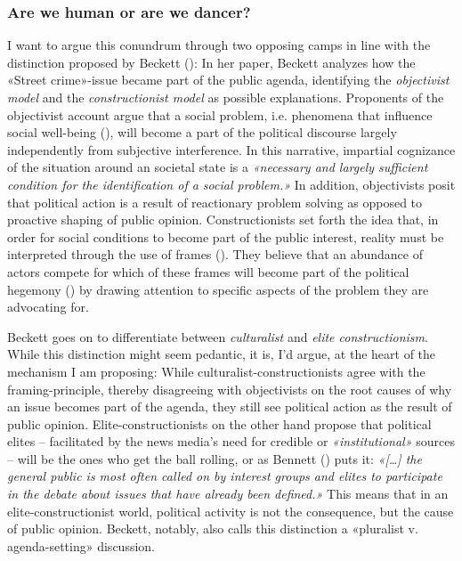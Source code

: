 \documentclass[11pt,a4paper]{article}
\begin{document}
\subsubsection{Are we human or are we dancer?}
I want to argue this conundrum through two opposing camps in line with the distinction proposed by Beckett (\citeyear{beckett_setting_1994}): In her paper, Beckett analyzes how the «Street crime»-issue became part of the public agenda, identifying the \textit{objectivist model} and the \textit{constructionist model }as possible explanations. Proponents of the objectivist account argue that a social problem, i.e. phenomena that influence social well-being (\cite{manis_concept_1974}), will become a part of the political discourse largely independently from subjective interference. In this narrative, impartial cognizance of the situation around an societal state is a \textit{«necessary and largely sufficient condition for the identification of a social problem.»} In addition, objectivists posit that political action is a result of reactionary problem solving as opposed to proactive shaping of public opinion. Constructionists set forth the idea that, in order for social conditions to become part of the public interest, reality must be interpreted through the use of frames (\cite{hall_policing_1978}). They believe that an abundance of actors compete for which of these frames will become part of the political hegemony (\cite{edelman_constructing_1988,gamson_media_1992}) by drawing attention to specific aspects of the problem they are advocating for. 

Beckett goes on to differentiate between \textit{culturalist} and \textit{elite constructionism}. While this distinction might seem pedantic, it is, I’d argue, at the heart of the mechanism I am proposing: While culturalist-constructionists agree with the framing-principle, thereby disagreeing with objectivists on the root causes of why an issue becomes part of the agenda, they still see political action as the result of public opinion. Elite-constructionists on the other hand propose that political elites – facilitated by the news media’s need for credible or \textit{«institutional»} sources – will be the ones who get the ball rolling, or as Bennett (\cite{bennett_public_1980}) puts it: \textit{«[…] the general public is most often called on by interest groups and elites to participate in the debate about issues that have already been defined.»} This means that in an elite-constructionist world, political activity is not the consequence, but the cause of public opinion. Beckett, notably, also calls this distinction a «pluralist v. agenda-setting» discussion.
\end{document}
